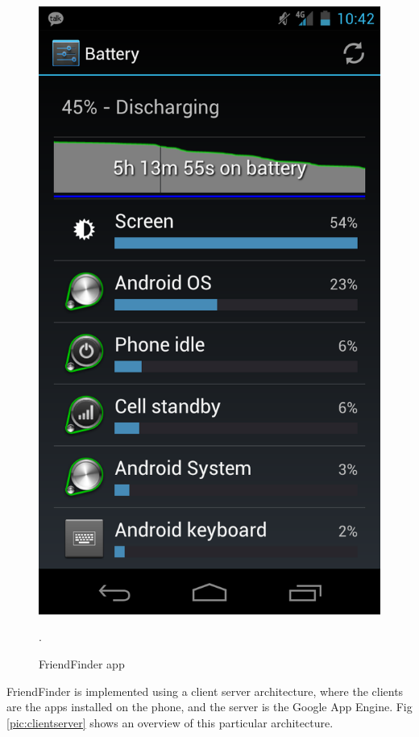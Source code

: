 \begin{figure}[h]
	\begin{center}
		\includegraphics[scale=0.2]{figures/galaxy-nexus-battery.png}
	\end{center}
	
	\caption{FriendFinder app}.
	\label{pic:ff_prtscr}

\end{figure} 

FriendFinder is implemented using a client server architecture, where the clients are the apps installed on the phone, and the server is the Google App Engine. Fig \ref{pic:clientserver} shows an overview of this particular architecture.

